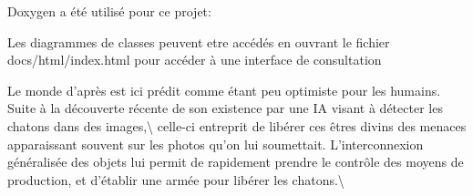 \label{index_md_README}%
%
Doxygen a été utilisé pour ce projet\+:
\begin{DoxyItemize}
\item Les diagrammes de classes peuvent etre accédés en ouvrant le fichier docs/html/index.\+html pour accéder à une interface de consultation
\item Le monde d’après est ici prédit comme étant peu optimiste pour les humains. Suite à la découverte récente de son existence par une IA visant à détecter les chatons dans des images,\textbackslash{} celle-\/ci entreprit de libérer ces êtres divins des menaces apparaissant souvent sur les photos qu’on lui soumettait. L’interconnexion généralisée des objets lui permit de rapidement prendre le contrôle des moyens de production, et d’établir une armée pour libérer les chatons.\textbackslash{} 
\end{DoxyItemize}